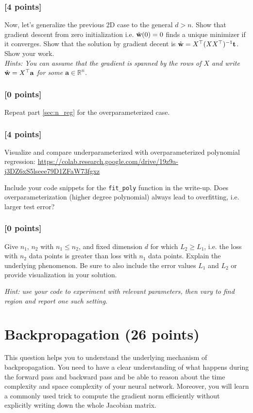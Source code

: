 \documentclass[11pt]{article}
\begin{document}
   
 \subsubsection{{\color{blue}[4 points]}}
   
   Now, let's generalize the previous 2D case to the general $d>n$. Show that gradient descent from zero initialization i.e. $\hat{\mathbf{w}}(0) = 0$ finds a unique minimizer if it converges. Show that the solution by gradient decent is $\hat{\mathbf{w}} = X^\top (XX^\top)^{-1}\mathbf{t}$. Show your work. \\
   
   \noindent \emph{Hints: You can assume that the gradient is spanned by the rows of $X$ and write $\hat{\mathbf{w}} = X^\top \mathbf{a}$ for some $\mathbf{a}\in\mathbb{R}^n$.}


\subsubsection{{[0 points]}} 
Repeat part \ref{sec:n_reg} for the overparameterized case.
   
   \subsubsection{{\color{blue}[4 points]}}
   Visualize and compare underparameterized with overparameterized polynomial regression:
   \url{https://colab.research.google.com/drive/19z9a-j3DZ6xS5lseee79D1ZFaW73fgxz}

   Include your code snippets for the \verb|fit_poly| function in the write-up. Does overparameterization (higher degree polynomial) always lead to overfitting, i.e. larger test error?
   
\subsubsection{[0 points]}
Give $n_1$, $n_2$ with $n_1 \leq n_2$, and fixed dimension $d$ for which $L_2 \geq L_1$, i.e. the loss with $n_2$ data points is greater than loss with $n_1$ data points. Explain the underlying phenomenon. Be sure to also include the error values $L_1$ and $L_2$ or provide visualization in your solution. 

\noindent \emph{Hint: use your code to experiment with relevant parameters, then vary to find region and report one such setting.}


\section{Backpropagation (26 points)} 
    This question helps you to understand the underlying mechanism of backpropagation. You need to have a clear understanding of what happens during the forward pass and backward pass and be able to reason about the time complexity and space complexity of your neural network. Moreover, you will learn a commonly used trick to compute the gradient norm efficiently without explicitly writing down the whole Jacobian matrix.\\
    
\end{document}
